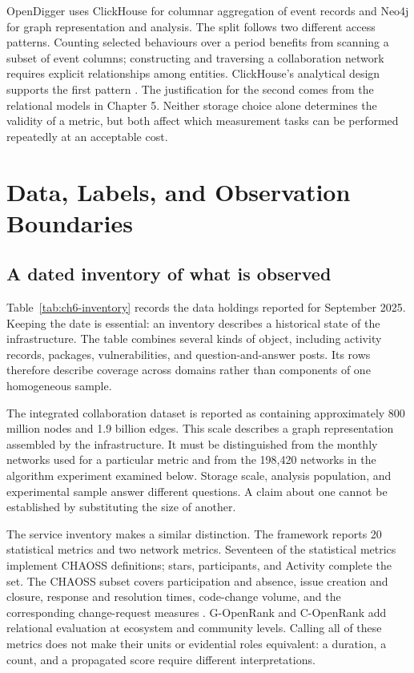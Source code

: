 OpenDigger uses ClickHouse for columnar aggregation of event records and Neo4j for graph representation and analysis. The split follows two different access patterns. Counting selected behaviours over a period benefits from scanning a subset of event columns; constructing and traversing a collaboration network requires explicit relationships among entities. ClickHouse's analytical design supports the first pattern \citep{schulze2024}. The justification for the second comes from the relational models in Chapter 5. Neither storage choice alone determines the validity of a metric, but both affect which measurement tasks can be performed repeatedly at an acceptable cost.

\section{Data, Labels, and Observation Boundaries}
\label{sec:ch6-observation}

\subsection{A dated inventory of what is observed}
Table~\ref{tab:ch6-inventory} records the data holdings reported for September 2025. Keeping the date is essential: an inventory describes a historical state of the infrastructure. The table combines several kinds of object, including activity records, packages, vulnerabilities, and question-and-answer posts. Its rows therefore describe coverage across domains rather than components of one homogeneous sample.



The integrated collaboration dataset is reported as containing approximately 800 million nodes and 1.9 billion edges. This scale describes a graph representation assembled by the infrastructure. It must be distinguished from the monthly networks used for a particular metric and from the 198,420 networks in the algorithm experiment examined below. Storage scale, analysis population, and experimental sample answer different questions. A claim about one cannot be established by substituting the size of another.

The service inventory makes a similar distinction. The framework reports 20 statistical metrics and two network metrics. Seventeen of the statistical metrics implement CHAOSS definitions; stars, participants, and Activity complete the set. The CHAOSS subset covers participation and absence, issue creation and closure, response and resolution times, code-change volume, and the corresponding change-request measures \citep[Table 6]{wang2026digger}. G-OpenRank and C-OpenRank add relational evaluation at ecosystem and community levels. Calling all of these metrics does not make their units or evidential roles equivalent: a duration, a count, and a propagated score require different interpretations.

